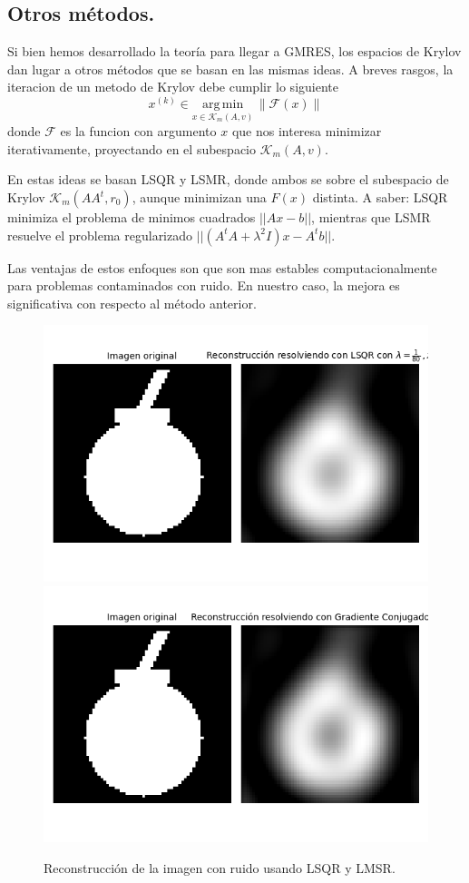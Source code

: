 \documentclass[12pt, oneside]{book}
\begin{document}
\subsection{Otros métodos.}

Si bien hemos desarrollado la teoría para llegar a GMRES, los espacios de Krylov dan lugar a otros métodos que se basan en las mismas ideas. 
 A breves rasgos, la iteracion de un metodo de Krylov debe cumplir lo siguiente
 $$x^{(k)} \in \underset{x \in \mathcal{K}_m(A, v)}{\mathrm{arg\,min}} \, \|\mathcal{F}(x)\|
 $$ 
 donde $\mathcal{F}$ es la funcion con argumento $x$ que nos interesa minimizar iterativamente, proyectando en el subespacio $\mathcal{K}_m(A,v)$.
 
 En estas ideas se basan LSQR y LSMR, donde ambos se sobre el subespacio de Krylov $\mathcal{K}_m (AA^t, r_0)$, aunque minimizan una $F(x)$ distinta. A saber: LSQR minimiza el problema de minimos cuadrados $||Ax-b||$, mientras que LSMR resuelve el problema regularizado $||(A^tA+\lambda ^2 I)x-A^tb||$.

Las ventajas de estos enfoques son que son mas estables computacionalmente para problemas contaminados con ruido. En nuestro caso, la mejora es significativa con respecto al método anterior. 

\begin{figure}[H]
	\centering
	\includegraphics[scale=0.5]{Imagenes/mate_lsqr.png}
	\includegraphics[scale=0.5]{Imagenes/mate_lsmr.png}
	\caption{Reconstrucción de la imagen con ruido usando LSQR y LMSR.\\}
\end{figure}
 
\end{document}
